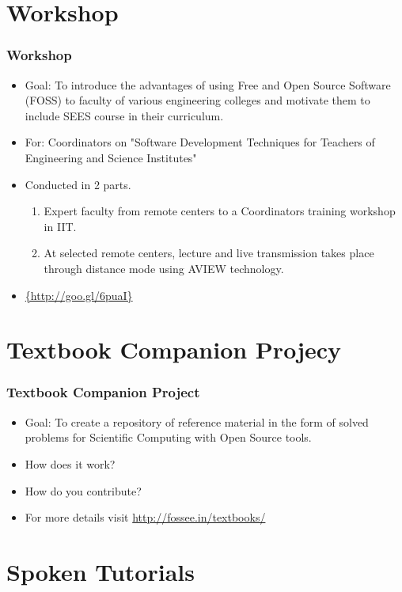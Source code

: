 \documentclass{beamer}
\begin{document}
\section{Workshop}

\begin{frame}
  \frametitle{Workshop}
  \begin{itemize}
  \item Goal: To introduce the advantages of using Free and Open Source Software (FOSS) to faculty of various engineering colleges and motivate them to include SEES course in their curriculum.
  \item For: Coordinators on "Software Development Techniques for Teachers of Engineering and Science Institutes"
  \item Conducted in 2 parts.
  \begin{enumerate}
  \item Expert faculty from remote centers to a Coordinators training workshop in IIT.
  \item At selected remote centers, lecture and live transmission takes place through distance mode using AVIEW technology. 
  \end{enumerate}
  \item \url{{http://goo.gl/6puaI}}
  \end{itemize}
\end{frame}


\section{Textbook Companion Projecy}

\begin{frame}	
	\frametitle{Textbook Companion Project}
	\begin{itemize}
	\item Goal: To create a repository of reference material in the form of solved problems for Scientific Computing with Open Source tools.
	\item How does it work?
	\item How do you contribute?
	\item For more details visit {\url{http://fossee.in/textbooks/}}
	\end{itemize}
\end{frame}

\section{Spoken Tutorials}
\end{document}
